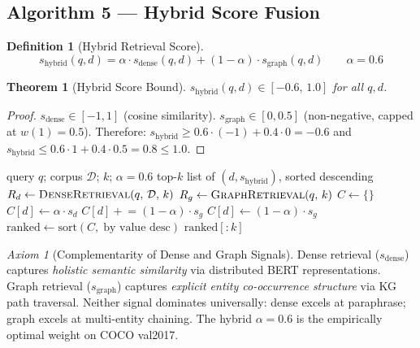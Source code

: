 \documentclass[12pt,a4paper]{article}
\theoremstyle{definition}
\newtheorem{definition}{Definition}[section]
\theoremstyle{plain}
\newtheorem{theorem}{Theorem}[section]
\theoremstyle{remark}
\newtheorem{axiom}{Axiom}[section]
\begin{document}
\subsection{Algorithm 5 --- Hybrid Score Fusion}

\begin{definition}[Hybrid Retrieval Score]
\label{def:hybrid}
\[
  \boxed{s_{\text{hybrid}}(q, d) =
    \alpha \cdot s_{\text{dense}}(q, d) +
    (1 - \alpha) \cdot s_{\text{graph}}(q, d)}
  \qquad \alpha = 0.6
\]
\end{definition}

\begin{theorem}[Hybrid Score Bound]
\label{thm:bound}
$s_{\text{hybrid}}(q,d) \in [-0.6,\, 1.0]$ for all $q, d$.
\end{theorem}
\begin{proof}
$s_{\text{dense}} \in [-1,1]$ (cosine similarity).
$s_{\text{graph}} \in [0, 0.5]$ (non-negative, capped at $w(1)=0.5$).
Therefore:
$s_{\text{hybrid}} \geq 0.6\cdot(-1)+0.4\cdot0 = -0.6$ and
$s_{\text{hybrid}} \leq 0.6\cdot1+0.4\cdot0.5 = 0.8 \leq 1.0$.
\end{proof}

\begin{algorithm}[H]
\caption{\textsc{HybridRetrieve}$(q,\, \mathcal{D},\, k)$}
\label{alg:hybrid}
\begin{algorithmic}[1]
\Require query $q$; corpus $\mathcal{D}$; $k$; $\alpha=0.6$
\Ensure top-$k$ list of $(d, s_{\text{hybrid}})$, sorted descending
\State $R_d \gets \textsc{DenseRetrieval}(q,\, \mathcal{D},\, k)$
\State $R_g \gets \textsc{GraphRetrieval}(q,\, k)$
\State $C \gets \{\}$
  \State $C[d] \gets \alpha \cdot s_d$
\EndFor
{}
   \;\State $C[d] \mathrel{+}= (1-\alpha)\cdot s_g$
  \Else \;\State $C[d] \gets (1-\alpha)\cdot s_g$
  \EndIf
\EndFor
\State $\text{ranked} \gets \text{sort}(C,\; \text{by value desc})$
\State \Return $\text{ranked}[:k]$
\end{algorithmic}
\end{algorithm}

\begin{axiom}[Complementarity of Dense and Graph Signals]
\label{ax:comp}
Dense retrieval ($s_{\text{dense}}$) captures \emph{holistic semantic
similarity} via distributed BERT representations. Graph retrieval
($s_{\text{graph}}$) captures \emph{explicit entity co-occurrence
structure} via KG path traversal. Neither signal dominates universally:
dense excels at paraphrase; graph excels at multi-entity chaining.
The hybrid $\alpha=0.6$ is the empirically optimal weight on COCO
val2017.
\end{axiom}
\end{document}
